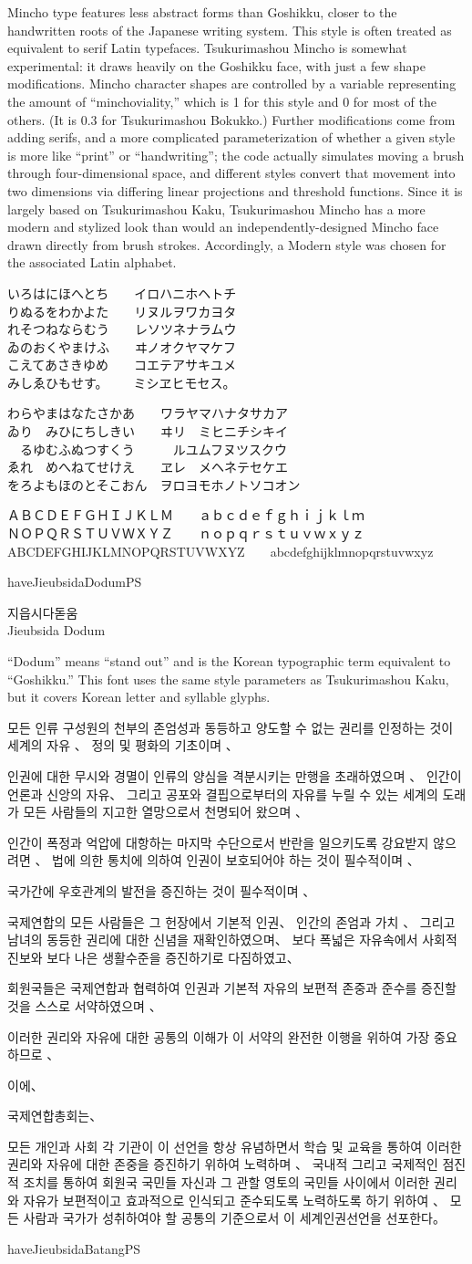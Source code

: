 \documentclass[14pt]{extarticle}
\newcommand{\iroha}{%
いろはにほへとち~~~~イロハニホヘトチ\\
りぬるをわかよた~~~~リヌルヲワカヨタ\\
れそつねならむう~~~~レソツネナラムウ\\
ゐのおくやまけふ~~~~ヰノオクヤマケフ\\
こえてあさきゆめ~~~~コエテアサキユメ\\
みしゑひもせす。~~~~ミシヱヒモセス。\par
}
\newcommand{\gojuuonzu}{%
わらやまはなたさかあ~~~~ワラヤマハナタサカア\\
ゐり~~みひにちしきい~~~~ヰリ~~ミヒニチシキイ\\
~~るゆむふぬつすくう~~~~~~ルユムフヌツスクウ\\
ゑれ~~めへねてせけえ~~~~ヱレ~~メヘネテセケエ\\
をろよもほのとそこおん~~ヲロヨモホノトソコオン\par
}
\newcommand{\undecl}{%
모든 인류 구성원의 천부의 존엄성과 동등하고 양도할 수 없는 권리를 인정하는
것이 세계의 자유 、 정의 및 평화의 기초이며 、

인권에 대한 무시와 경멸이 인류의 양심을 격분시키는 만행을 초래하였으며 、
인간이 언론과 신앙의 자유、 그리고 공포와 결핍으로부터의 자유를 누릴 수 있는
세계의 도래가 모든 사람들의 지고한 열망으로서 천명되어 왔으며 、

인간이 폭정과 억압에 대항하는 마지막 수단으로서 반란을 일으키도록 강요받지
않으려면 、 법에 의한 통치에 의하여 인권이 보호되어야 하는 것이 필수적이며 、

국가간에 우호관계의 발전을 증진하는 것이 필수적이며 、

국제연합의 모든 사람들은 그 헌장에서 기본적 인권、 인간의 존엄과 가치 、
그리고 남녀의 동등한 권리에 대한 신념을 재확인하였으며、 보다 폭넓은
자유속에서 사회적 진보와 보다 나은 생활수준을 증진하기로 다짐하였고、

회원국들은 국제연합과 협력하여 인권과 기본적 자유의 보편적 존중과 준수를
증진할 것을 스스로 서약하였으며 、

이러한 권리와 자유에 대한 공통의 이해가 이 서약의 완전한 이행을 위하여 가장
중요하므로 、

이에、

국제연합총회는、

모든 개인과 사회 각 기관이 이 선언을 항상 유념하면서 학습 및 교육을 통하여
이러한 권리와 자유에 대한 존중을 증진하기 위하여 노력하며 、 국내적 그리고
국제적인 점진적 조치를 통하여 회원국 국민들 자신과 그 관할 영토의 국민들
사이에서 이러한 권리와 자유가 보편적이고 효과적으로 인식되고 준수되도록
노력하도록 하기 위하여 、 모든 사람과 국가가 성취하여야 할 공통의 기준으로서
이 세계인권선언을 선포한다。 
\par
}
\begin{document}
Mincho type features less abstract forms than Goshikku, closer to the
handwritten roots of the Japanese writing system.  This style is often
treated as equivalent to serif Latin typefaces.  Tsukurimashou Mincho is
somewhat experimental: it draws heavily on the Goshikku face, with just a
few shape modifications.  Mincho character shapes are controlled by a
variable representing the amount of ``minchoviality,'' which is 1 for this
style and 0 for most of the others.  (It is 0.3 for Tsukurimashou Bokukko.)
Further modifications come from adding serifs, and a more complicated
parameterization of whether a given style is more like ``print'' or
``handwriting''; the code actually simulates moving a brush through
four-dimensional space, and different styles convert that movement into two
dimensions via differing linear projections and threshold functions. Since
it is largely based on Tsukurimashou Kaku, Tsukurimashou Mincho has a more
modern and stylized look than would an independently-designed Mincho face
drawn directly from brush strokes.  Accordingly, a Modern style was chosen
for the associated Latin alphabet.

\minchomono
\iroha
\gojuuonzu

ＡＢＣＤＥＦＧＨＩＪＫＬＭ~~~~ａｂｃｄｅｆｇｈｉｊｋｌｍ\\
ＮＯＰＱＲＳＴＵＶＷＸＹＺ~~~~ｎｏｐｑｒｓｔｕｖｗｘｙｚ\\
ABCDEFGHIJKLMNOPQRSTUVWXYZ~~~~abcdefghijklmnopqrstuvwxyz

\clearpage


\expandafter\ifx\csname haveJieubsidaDodumPS\endcsname\relax\else

\dodum

\Large
지읍시다돋움\\
Jieubsida Dodum

\normalsize

``Dodum'' means ``stand out'' and is the Korean typographic term equivalent
to ``Goshikku.''  This font uses the same style parameters as Tsukurimashou
Kaku, but it covers Korean letter and syllable glyphs.

\undecl

\clearpage

\fi


\expandafter\ifx\csname haveJieubsidaBatangPS\endcsname\relax\else
\end{document}
